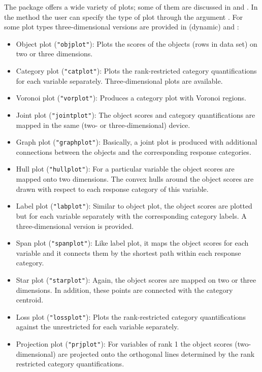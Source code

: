\documentclass[article]{jss1}
\begin{document}
The package offers a wide variety of plots; some of them are discussed in \citet{Michailidis+deLeeuw:98} and \citet{ Michailidis+deLeeuw:01}. In the  method the user can specify the type of plot through the argument . For some plot types three-dimensional versions are provided in  (dynamic) and :
\begin{itemize}
\item Object plot (\texttt{"objplot"}): Plots the scores of the objects (rows in data set) on two or three dimensions. 
\item Category plot (\texttt{"catplot"}): Plots the rank-restricted category quantifications for each variable separately. Three-dimensional plots are available.
\item Voronoi plot (\texttt{"vorplot"}): Produces a category plot with Voronoi regions.
\item Joint plot (\texttt{"jointplot"}): The object scores and category quantifications are mapped in the same (two- or three-dimensional) device.
\item Graph plot (\texttt{"graphplot"}): Basically, a joint plot is produced with additional connections between the objects and the corresponding response categories.
\item Hull plot (\texttt{"hullplot"}): For a particular variable the object scores are mapped onto two dimensions. The convex hulls around the object scores are drawn with respect to each response category of this variable. 
\item Label plot (\texttt{"labplot"}): Similar to object plot, the object scores are plotted but for each variable separately with the corresponding category labels. A three-dimensional version is provided.
\item Span plot (\texttt{"spanplot"}): Like label plot, it maps the object scores for each variable and it connects them by the shortest path within each response category.
\item Star plot (\texttt{"starplot"}): Again, the object scores are mapped on two or three dimensions. In addition, these points are connected with the category centroid. 
\item Loss plot (\texttt{"lossplot"}): Plots the rank-restricted category quantifications against the unrestricted for each variable separately.
\item Projection plot (\texttt{"prjplot"}): For variables of rank 1 the object scores (two-dimensional) are projected onto
the orthogonal lines determined by the rank restricted category quantifications.  

\end{itemize}
\end{document}
